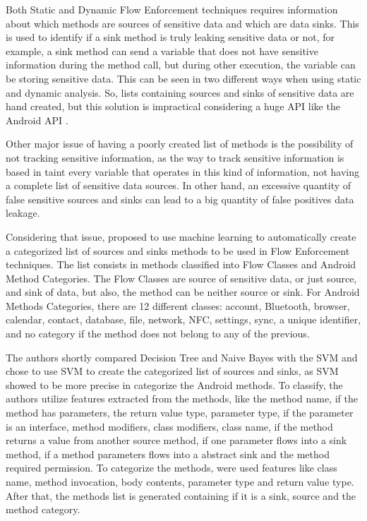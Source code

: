 Both Static and Dynamic Flow Enforcement techniques requires information about which methods are sources of sensitive data and which are data sinks. This is used to identify if a sink method is truly leaking sensitive data or not, for example, a sink method can send a variable that does not have sensitive information during the method call, but during other execution, the variable can be storing sensitive data. This can be seen in two different ways when using static and dynamic analysis. So, lists containing sources and sinks of sensitive data are hand created, but this solution is impractical considering a huge API like the Android API \citep{rasthofer2014machine}.

Other major issue of having a poorly created list of methods is the possibility of not tracking sensitive information, as the way to track sensitive information is based in taint every variable that operates in this kind of information, not having a complete list of sensitive data sources. In other hand, an excessive quantity of false sensitive sources and sinks can lead to a big quantity of false positives data leakage. 

Considering that issue, \cite{rasthofer2014machine} proposed to use machine learning to automatically create a categorized list of sources and sinks methods to be used in Flow Enforcement techniques. The list consists in methods classified into Flow Classes and Android Method Categories. The Flow Classes are source of sensitive data, or just source, and sink of data, but also, the method can be neither source or sink. For Android Methods Categories, there are 12 different classes: account, Bluetooth, browser, calendar, contact, database, file, network, NFC, settings, sync, a unique identifier, and no category if the method does not belong to any of the previous.

The authors shortly compared Decision Tree and Naive Bayes with the SVM and chose to use SVM to create the categorized list of sources and sinks, as SVM showed to be more precise in categorize the Android methods. To classify, the authors utilize features extracted from the methods, like the method name, if the method has parameters, the return value type, parameter type, if the parameter is an interface, method modifiers, class modifiers, class name, if the method returns a value from another source method, if one parameter flows into a sink method, if a method parameters flows into a abstract sink and the method required permission. To categorize the methods, were used features like class name, method invocation, body contents, parameter type and return value type. After that, the methods list is generated containing if it is a sink, source and the method category.

